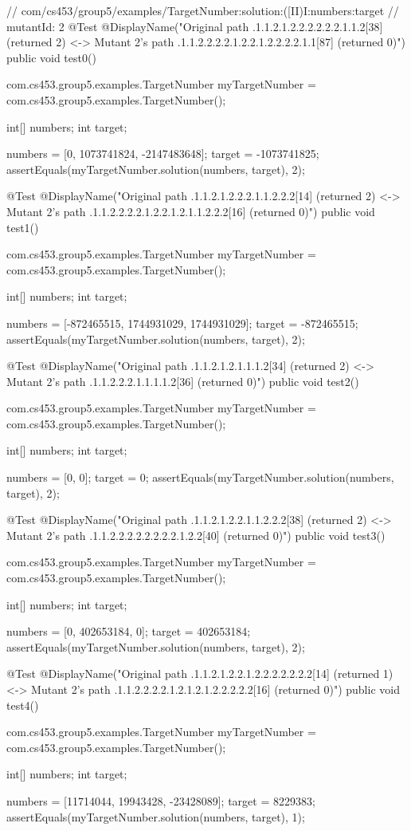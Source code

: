// com/cs453/group5/examples/TargetNumber:solution:([II)I:numbers:target
// mutantId: 2
@Test
@DisplayName("Original path .1.1.2.1.2.2.2.2.2.2.1.1.2[38] (returned 2) <-> Mutant 2's path .1.1.2.2.2.2.1.2.2.1.2.2.2.2.1.1[87] (returned 0)")
public void test0() {
    com.cs453.group5.examples.TargetNumber myTargetNumber = com.cs453.group5.examples.TargetNumber();

    int[] numbers;
    int target;

    numbers = [0, 1073741824, -2147483648];
    target = -1073741825;
    assertEquals(myTargetNumber.solution(numbers, target), 2);
}

@Test
@DisplayName("Original path .1.1.2.1.2.2.2.1.1.2.2.2[14] (returned 2) <-> Mutant 2's path .1.1.2.2.2.2.1.2.2.1.2.1.1.2.2.2[16] (returned 0)")
public void test1() {
    com.cs453.group5.examples.TargetNumber myTargetNumber = com.cs453.group5.examples.TargetNumber();

    int[] numbers;
    int target;

    numbers = [-872465515, 1744931029, 1744931029];
    target = -872465515;
    assertEquals(myTargetNumber.solution(numbers, target), 2);
}

@Test
@DisplayName("Original path .1.1.2.1.2.1.1.1.2[34] (returned 2) <-> Mutant 2's path .1.1.2.2.2.1.1.1.1.2[36] (returned 0)")
public void test2() {
    com.cs453.group5.examples.TargetNumber myTargetNumber = com.cs453.group5.examples.TargetNumber();

    int[] numbers;
    int target;

    numbers = [0, 0];
    target = 0;
    assertEquals(myTargetNumber.solution(numbers, target), 2);
}

@Test
@DisplayName("Original path .1.1.2.1.2.2.1.1.2.2.2[38] (returned 2) <-> Mutant 2's path .1.1.2.2.2.2.2.2.2.2.1.2.2[40] (returned 0)")
public void test3() {
    com.cs453.group5.examples.TargetNumber myTargetNumber = com.cs453.group5.examples.TargetNumber();

    int[] numbers;
    int target;

    numbers = [0, 402653184, 0];
    target = 402653184;
    assertEquals(myTargetNumber.solution(numbers, target), 2);
}

@Test
@DisplayName("Original path .1.1.2.1.2.2.1.2.2.2.2.2.2.2[14] (returned 1) <-> Mutant 2's path .1.1.2.2.2.2.1.2.1.2.1.2.2.2.2.2[16] (returned 0)")
public void test4() {
    com.cs453.group5.examples.TargetNumber myTargetNumber = com.cs453.group5.examples.TargetNumber();

    int[] numbers;
    int target;

    numbers = [11714044, 19943428, -23428089];
    target = 8229383;
    assertEquals(myTargetNumber.solution(numbers, target), 1);
}

